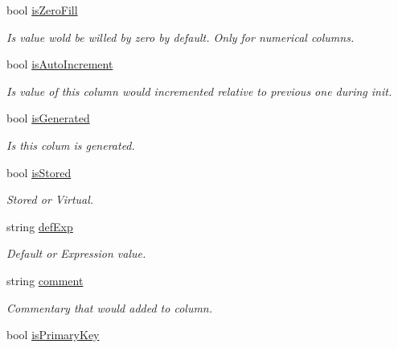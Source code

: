 \begin{DoxyCompactItemize}
bool \mbox{\hyperlink{struct_uniform_data_operator_1_1_s_q_l_1_1_tables_1_1_table_column_meta_ac44c4b5da6b44872bd069b4842fd6948}{is\+Zero\+Fill}}
\begin{DoxyCompactList}\small\item\em Is value wold be willed by zero by default. Only for numerical columns. \end{DoxyCompactList}\item 
bool \mbox{\hyperlink{struct_uniform_data_operator_1_1_s_q_l_1_1_tables_1_1_table_column_meta_a6ebe4a5185b6b4273f0b4cdf68161064}{is\+Auto\+Increment}}
\begin{DoxyCompactList}\small\item\em Is value of this column would incremented relative to previous one during init. \end{DoxyCompactList}\item 
bool \mbox{\hyperlink{struct_uniform_data_operator_1_1_s_q_l_1_1_tables_1_1_table_column_meta_af0bb00291b16439c43fdc8fd98bd14be}{is\+Generated}}
\begin{DoxyCompactList}\small\item\em Is this colum is generated. \end{DoxyCompactList}\item 
bool \mbox{\hyperlink{struct_uniform_data_operator_1_1_s_q_l_1_1_tables_1_1_table_column_meta_aa098249a3873650245e796c855dc3a78}{is\+Stored}}
\begin{DoxyCompactList}\small\item\em Stored or Virtual. \end{DoxyCompactList}\item 
string \mbox{\hyperlink{struct_uniform_data_operator_1_1_s_q_l_1_1_tables_1_1_table_column_meta_a426aeb143cf2aeba1cfb749f0de5630e}{def\+Exp}}
\begin{DoxyCompactList}\small\item\em Default or Expression value. \end{DoxyCompactList}\item 
string \mbox{\hyperlink{struct_uniform_data_operator_1_1_s_q_l_1_1_tables_1_1_table_column_meta_a1423e182970cb18fdf08adadde6d6cd2}{comment}}
\begin{DoxyCompactList}\small\item\em Commentary that would added to column. \end{DoxyCompactList}\item 
bool \mbox{\hyperlink{struct_uniform_data_operator_1_1_s_q_l_1_1_tables_1_1_table_column_meta_af32b6ebc700969a0d2acb9d723f8ba46}{is\+Primary\+Key}}

\end{DoxyCompactItemize}
